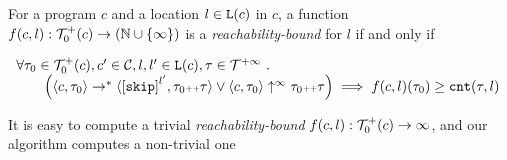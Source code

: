 \begin{defn}
  \label{def:rb}
  For a program ${c}$ and a location $l \in \mathtt{L}(c)$ in $c$,
a function $f(c, l) : \mathcal{T}^{+}_0(c) \to (\mathbb{N} \cup \{\infty\})$ is a \emph{reachability-bound} for $l$ if and only if
{\small
\begin{center}
  $
\begin{array}{l}
  \forall \trace_0 \in \ftdom_0(c), c' \in \cdom, l, l' \in \lvar(c), \trace \in \tdom \st 
  \\ \qquad
  \Big(
    \config{{c}, \trace_0} \to^{*} \config{\clabel{\eskip}^{l'}, \trace_0 \tracecat \trace} 
    \lor 
    \config{{c}, \trace_0} \uparrow^{\infty} \trace_0 \tracecat \trace 
  \Big)
  \implies f({c}, l)(\trace_0) \geq \counter(\trace, l) 
  \end{array}
  $
\end{center}
}
\end{defn}
It is easy to compute a trivial \emph{reachability-bound} $f(c, l): \mathcal{T}^{+}_0(c) \to \infty$, and 
our algorithm computes a non-trivial one
